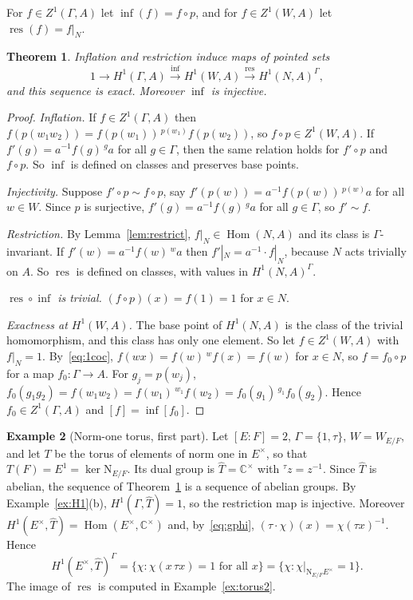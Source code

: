 \documentclass[12pt,letterpaper]{article}
\numberwithin{equation}{section}
\theoremstyle{plain}
\newtheorem{theorem}{Theorem}[section]
\theoremstyle{definition}
\newtheorem{example}[theorem]{Example}
\newcommand{\C}{\mathbb{C}}
\newcommand{\Th}{\widehat{T}}
\newcommand{\act}[2]{{}^{#1}\!#2}          %
\DeclareMathOperator{\Hom}{Hom}
\DeclareMathOperator{\infl}{inf}
\DeclareMathOperator{\res}{res}
\newcommand{\Nm}{\mathrm{N}_{E/F}}
\begin{document}
For $f\in Z^1(\Gamma,A)$ let $\infl(f)=f\circ p$, and for $f\in Z^1(W,A)$
let $\res(f)=f|_N$.

\begin{theorem}\label{thm:exact}
Inflation and restriction induce maps of pointed sets
\[
1\longrightarrow H^1(\Gamma,A)\overset{\infl}{\longrightarrow}
H^1(W,A)\overset{\res}{\longrightarrow}H^1(N,A)^\Gamma ,
\]
and this sequence is exact. Moreover $\infl$ is injective.
\end{theorem}

\begin{proof}
\emph{Inflation.} If $f\in Z^1(\Gamma,A)$ then
$f(p(w_1w_2))=f(p(w_1))\,\act{p(w_1)}{f(p(w_2))}$, so
$f\circ p\in Z^1(W,A)$. If $f'(g)=a^{-1}f(g)\,\act{g}{a}$ for all
$g\in\Gamma$, then the same relation holds for $f'\circ p$ and $f\circ p$.
So $\infl$ is defined on classes and preserves base points.

\emph{Injectivity.} Suppose $f'\circ p\sim f\circ p$, say
$f'(p(w))=a^{-1}f(p(w))\,\act{p(w)}{a}$ for all $w\in W$. Since $p$ is
surjective, $f'(g)=a^{-1}f(g)\,\act{g}{a}$ for all $g\in\Gamma$, so
$f'\sim f$.

\emph{Restriction.} By Lemma~\ref{lem:restrict}, $f|_N\in\Hom(N,A)$ and its
class is $\Gamma$-invariant. If $f'(w)=a^{-1}f(w)\,\act{w}{a}$ then
$f'|_N=a^{-1}\cdot f|_N$, because $N$ acts trivially on $A$. So $\res$ is
defined on classes, with values in $H^1(N,A)^\Gamma$.

\emph{$\res\circ\infl$ is trivial.} $(f\circ p)(x)=f(1)=1$ for $x\in N$.

\emph{Exactness at $H^1(W,A)$.} The base point of $H^1(N,A)$ is the class
of the trivial homomorphism, and this class has only one element. So let
$f\in Z^1(W,A)$ with $f|_N=1$. By~\eqref{eq:1coc},
$f(wx)=f(w)\,\act{w}{f(x)}=f(w)$ for $x\in N$, so $f=f_0\circ p$ for a map
$f_0:\Gamma\to A$. For $g_j=p(w_j)$,
$f_0(g_1g_2)=f(w_1w_2)=f(w_1)\,\act{w_1}{f(w_2)}
=f_0(g_1)\,\act{g_1}{f_0(g_2)}$. Hence $f_0\in Z^1(\Gamma,A)$ and
$[f]=\infl[f_0]$.
\end{proof}

\begin{example}[Norm-one torus, first part]\label{ex:torus1}
Let $[E:F]=2$, $\Gamma=\{1,\tau\}$, $W=W_{E/F}$, and let $T$ be the torus
of elements of norm one in $E^\times$, so that $T(F)=E^1=\ker\Nm$. Its dual
group is $\Th=\C^\times$ with $\act{\tau}{z}=z^{-1}$. Since
$\Th$ is abelian, the sequence of Theorem~\ref{thm:exact} is a sequence of
abelian groups. By Example~\ref{ex:H1}(b), $H^1(\Gamma,\Th)=1$, so the
restriction map is injective. Moreover
$H^1(E^\times,\Th)=\Hom(E^\times,\C^\times)$ and, by~\eqref{eq:gphi},
$(\tau\cdot\chi)(x)=\chi(\tau x)^{-1}$. Hence
\[
H^1(E^\times,\Th)^\Gamma=\{\chi:\chi(x\,\tau x)=1\text{ for all }x\}
=\{\chi:\chi|_{\Nm E^\times}=1\}.
\]
The image of $\res$ is computed in Example~\ref{ex:torus2}.
\end{example}
\end{document}
